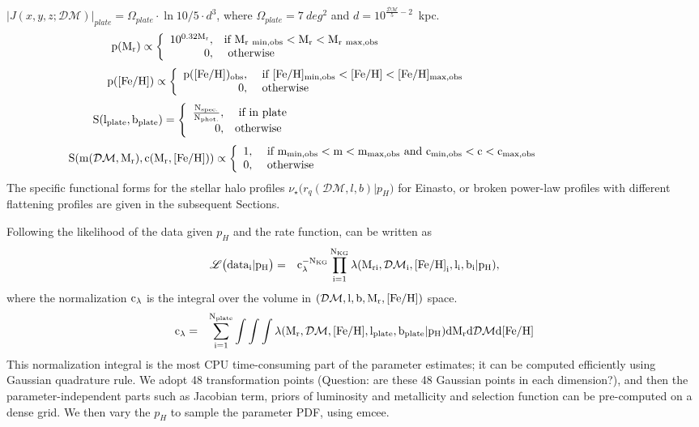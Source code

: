 \documentclass[12pt,preprint]{aastex}
\newcommand{\DM}{\mathcal{DM}}
\newcommand{\feh}{{\rm [Fe/H]}}
\newcommand{\lph}{\mathscr{L}\bigl({data_i}|p_H\bigr)}
\begin{document}
$ |J(x,y,z;\DM)|_{plate} = \Omega_{plate} \cdot \ln10 / 5 \cdot  d^3$,
 where $\Omega_{plate}=7~deg^2$ and $d=10^{\frac{\DM}{5}-2}$~kpc.
\begin{eqnarray}
\rm p(M_r) \propto \left\{ \begin{array}{rl}
\rm 10^{0.32M_r}, &\mbox{\rm if $\rm M_{r~min,obs}<M_r<M_{r~max,obs}$} ~~~~~~~~~~~~~~~~~~~~~~~~~~~~~~~~~~~~~~~~~~~~~~~~~~~~~~~\\
0, &\mbox{ \rm otherwise}~~~~~~~~~~~~~~~~~~~~~~~~~~~~~~~~~~~~~~~~~~~~~~~~~~~~~~~~~~~~~~~~~~~~~~~~~~~~~~~~~~~~
\end{array} \right.\nonumber
\end{eqnarray}
$$
\rm p(\feh) \propto \left\{ \begin{array}{rl}\rm p(\feh)_{obs}, &\mbox{ \rm if $\rm [Fe/H]_{min,obs}<\feh<[Fe/H]_{max,obs}$} ~~~~~~~~~~~~~~~~~~~~~~~~~~~~~~~~~~~\\
0, &\mbox{ \rm otherwise}~~~~~~~~~~~~~~~~~~~~~~~~~~~~~~~~
\end{array} \right.
$$
$$
\rm S(l_{plate},b_{plate})=\left\{ \begin{array}{rl}
\rm \frac{\rm N_{spec.}}{\rm N_{phot.}}, &\mbox{ \rm if in plate} ~~~~~~~~~~~~~~~~~~~~~~~~~~~~~~~~~~~~~~~~~~~~~~~~~~~~~~~~~~~~~~~~~~~~~~~~~~~~~\\
0, &\mbox{\rm otherwise}~~~~~~~~~~~~~~~~~~~~~~~~~~~~~~~~~~~~~~~~~~~~~~~~~~~~~~~~~~~~~~~~~~~~~~~~~~~~~~~~~~~~~~~
\end{array} \right.
$$
$$
\rm S(m(\DM,M_r),c(M_r,\feh))\propto \left\{ \begin{array}{rl}
1, &\mbox{ \rm if $\rm m_{min,obs}<m<m_{max,obs}$ and $\rm c_{min,obs}<c<c_{max,obs}$} ~~~~~~~~~~~~~~~~~~~~~~~~~~ \\
0, &\mbox{ otherwise}~~~~~~~~~~~~~~~~~~~~~~~~~~~~~~~~~~~~~~~~~~~~~~~~~~~~~
\end{array} \right.
$$
The specific functional forms for the stellar halo profiles $\nu_\star\bigl (r_q(\DM,l,b)|p_H\bigr )$
for Einasto, or broken power-law profiles with different flattening profiles are given in the subsequent Sections.

Following \citet{Bovy2012} the likelihood of the data given $p_H$ and the rate function, can be written as
\begin{eqnarray}
\rm \lph &=& \rm c_{\lambda}^{-N_{KG}}\prod \limits_{i=1}^{N_{KG}}\lambda(M_{ri},\DM_i,\feh_i,l_i,b_i|p_H),
\end{eqnarray}
where the normalization $\rm c_\lambda$ is the integral over the volume in $\rm (\DM,l,b,M_r,\feh)$ space.
\begin{eqnarray}
\rm c_\lambda&=&\rm \sum \limits_{i=1}^{N_{plate}} \int\int\int \lambda(M_r,\DM,\feh,l_{plate},b_{plate}|p_H)dM_rd \DM d \feh
\end{eqnarray}
This normalization integral is the most CPU time-consuming part of the parameter estimates; it can be computed efficiently using Gaussian quadrature rule. We adopt 48 transformation points (Question: are these 48 Gaussian points in each dimension?), and then the parameter-independent parts such as Jacobian term, priors of luminosity and metallicity and selection function can be pre-computed on a dense grid. We then vary the $p_H$ to sample the parameter PDF, using emcee\citep{Foreman2013}.
\end{document}
